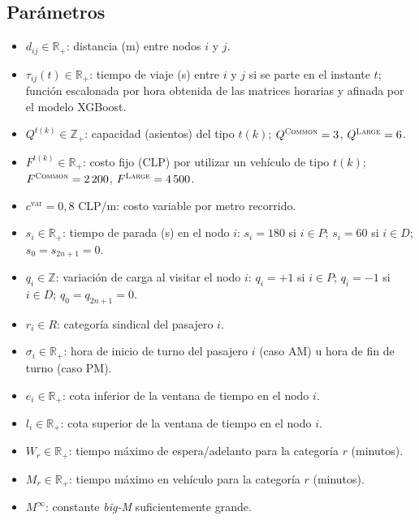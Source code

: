 \subsection{Parámetros}
\begin{itemize}
    \item $d_{ij}\in\mathbb{R}_+$: distancia (m) entre nodos $i$ y $j$.
    \item $\tau_{ij}(t)\in\mathbb{R}_+$: tiempo de viaje (s) entre $i$ y $j$ si se parte en el instante $t$; función escalonada por hora obtenida de las matrices horarias y afinada por el modelo XGBoost.
    \item $Q^{t(k)}\in\mathbb{Z}_+$: capacidad (asientos) del tipo $t(k)$; $Q^{\textsc{Common}}=3$, $Q^{\textsc{Large}}=6$.
    \item $F^{t(k)}\in\mathbb{R}_+$: costo fijo (CLP) por utilizar un vehículo de tipo $t(k)$; $F^{\textsc{Common}}=2\,200$, $F^{\textsc{Large}}=4\,500$.
    \item $c^{\mathrm{var}}=0{,}8$ CLP/m: costo variable por metro recorrido.
    \item $s_i\in\mathbb{R}_+$: tiempo de parada (s) en el nodo $i$: $s_i=180$ si $i\in P$; $s_i=60$ si $i\in D$; $s_0=s_{2n+1}=0$.
    \item $q_i\in\mathbb{Z}$: variación de carga al visitar el nodo $i$: $q_i=+1$ si $i\in P$; $q_i=-1$ si $i\in D$; $q_0=q_{2n+1}=0$.
    \item $r_i\in R$: categoría sindical del pasajero $i$.
    \item $\sigma_i\in\mathbb{R}_+$: hora de inicio de turno del pasajero $i$ (caso AM) u hora de fin de turno (caso PM).
    \item $e_i\in\mathbb{R}_+$: cota inferior de la ventana de tiempo en el nodo $i$.
    \item $l_i\in\mathbb{R}_+$: cota superior de la ventana de tiempo en el nodo $i$.
    \item $W_r\in\mathbb{R}_+$: tiempo máximo de espera/adelanto para la categoría $r$ (minutos).
    \item $M_r\in\mathbb{R}_+$: tiempo máximo en vehículo para la categoría $r$ (minutos).
    \item $M^\infty$: constante \textit{big-M} suficientemente grande.
\end{itemize}


